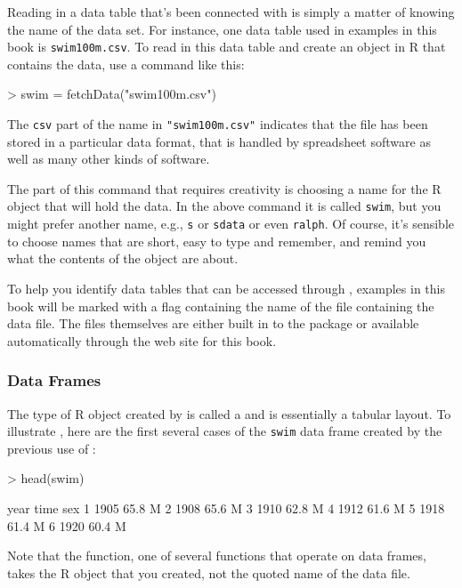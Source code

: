 Reading in a data table that's been connected with 
is simply a matter of knowing the name of the data set.  For instance,
one data table used in examples in this book is
\texttt{swim100m.csv}.  To read in this data table and create an
object in R that contains the data, use a command like this:
\datasetSwimming
\begin{Schunk}
\begin{Sinput}
> swim = fetchData("swim100m.csv")
\end{Sinput}
\end{Schunk}

The \texttt{csv} part of the name in \texttt{"swim100m.csv"} indicates
that the file has been stored in a particular data format,
 that is handled by spreadsheet
software as well as many other kinds of software.

The part of this command that requires creativity is choosing a
name for the R object that will hold the data.  In the above command
it is called \texttt{swim}, but you might prefer another name, e.g.,
\texttt{s} or \texttt{sdata} or even \texttt{ralph}.  Of course, it's
sensible to choose names that are short, easy to type and remember,
and remind you what the contents of the object are about.

To help you identify data tables that can be accessed through
, examples in this book will be marked with a flag
containing the name of the file containing the data file.  The files
themselves are either built in to the  package or
available automatically through the web site for this book.

\subsubsection{Data Frames}

The type of R object created by  is called a
 and is essentially a tabular layout. To illustrate , here are the first several cases
of the \texttt{swim} data frame created by the previous use of :
\begin{Schunk}
\begin{Sinput}
> head(swim)
\end{Sinput}
\begin{Soutput}
  year time sex
1 1905 65.8   M
2 1908 65.6   M
3 1910 62.8   M
4 1912 61.6   M
5 1918 61.4   M
6 1920 60.4   M
\end{Soutput}
\end{Schunk}
Note that the  function, one of several functions that
operate on data frames, takes the R object that you
created, not the quoted name of the data file.  

